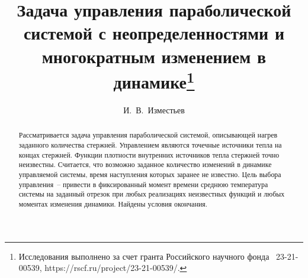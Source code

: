 \usepackage[russian]{nla}


\fi

\title{Задача управления параболической\\ системой с неопределенностями и\\ многократным изменением в 
динамике\thanks{Исследования выполнено за счет гранта Российского научного фонда \textnumero~23-21-00539, https://rscf.ru/project/23-21-00539/.}}
\author{И.~В.~Изместьев 
}


\maketitle

\begin{abstract}
Рассматривается задача управления параболической системой, описывающей нагрев заданного количества стержней. Управлением являются точечные источники тепла на концах стержней. Функции плотности внутренних источников тепла стержней точно неизвестны. Считается, что возможно заданное количество изменений в динамике управляемой системы, время наступления которых заранее не известно. Цель выбора управления~-- привести в фиксированный момент времени среднюю температура системы на заданный отрезок при любых реализациях неизвестных функций и любых моментах изменения динамики. Найдены условия окончания.

\end{abstract}

